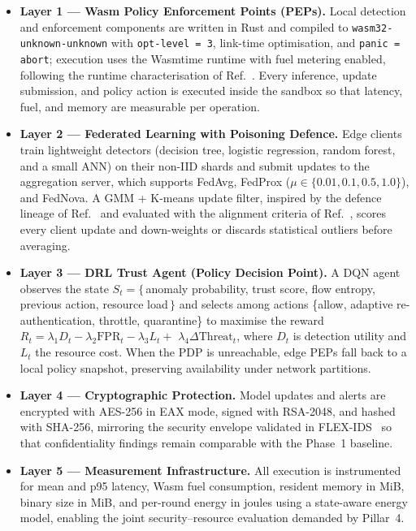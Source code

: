 \documentclass[11pt,a4paper]{article}
\begin{document}
\begin{itemize}[leftmargin=1.6em,itemsep=3pt]
  \item \textbf{Layer 1 --- Wasm Policy Enforcement Points (PEPs).} Local
  detection and enforcement components are written in Rust and compiled to
  \texttt{wasm32-unknown-unknown} with \texttt{opt-level = 3}, link-time
  optimisation, and \texttt{panic = abort}; execution uses the Wasmtime
  runtime with fuel metering enabled, following the runtime characterisation
  of Ref.~\cite{zhang2025}. Every inference, update submission, and policy
  action is executed inside the sandbox so that latency, fuel, and memory
  are measurable per operation.
  \item \textbf{Layer 2 --- Federated Learning with Poisoning Defence.}
  Edge clients train lightweight detectors (decision tree, logistic
  regression, random forest, and a small ANN) on their non-IID shards and
  submit updates to the aggregation server, which supports FedAvg,
  FedProx ($\mu \in \{0.01, 0.1, 0.5, 1.0\}$), and FedNova. A
  GMM + K-means update filter, inspired by the defence lineage of
  Ref.~\cite{rezaei2025} and evaluated with the alignment criteria of
  Ref.~\cite{djemaa2026}, scores every client update and down-weights or
  discards statistical outliers before averaging.
  \item \textbf{Layer 3 --- DRL Trust Agent (Policy Decision Point).} A
  DQN agent observes the state
  $S_t = \{\,$anomaly probability, trust score, flow entropy, previous
  action, resource load$\,\}$ and selects
  among actions \{allow, adaptive re-authentication, throttle,
  quarantine\} to maximise the reward
  $R_t = \lambda_1 D_t - \lambda_2 \mathrm{FPR}_t - \lambda_3 L_t +$
  $\lambda_4 \Delta\mathrm{Threat}_t$, where $D_t$ is detection utility
  and $L_t$ the resource cost. When the PDP is unreachable, edge PEPs fall back
  to a local policy snapshot, preserving availability under network
  partitions.
  \item \textbf{Layer 4 --- Cryptographic Protection.} Model updates and
  alerts are encrypted with AES-256 in EAX mode, signed with RSA-2048, and
  hashed with SHA-256, mirroring the security envelope validated in
  FLEX-IDS~\cite{flexids} so that confidentiality findings remain
  comparable with the Phase~1 baseline.
  \item \textbf{Layer 5 --- Measurement Infrastructure.} All execution is
  instrumented for mean and p95 latency, Wasm fuel consumption, resident
  memory in MiB, binary size in MiB, and per-round energy in joules using
  a state-aware energy model, enabling the joint security--resource
  evaluation demanded by Pillar~4.
\end{itemize}
\end{document}
